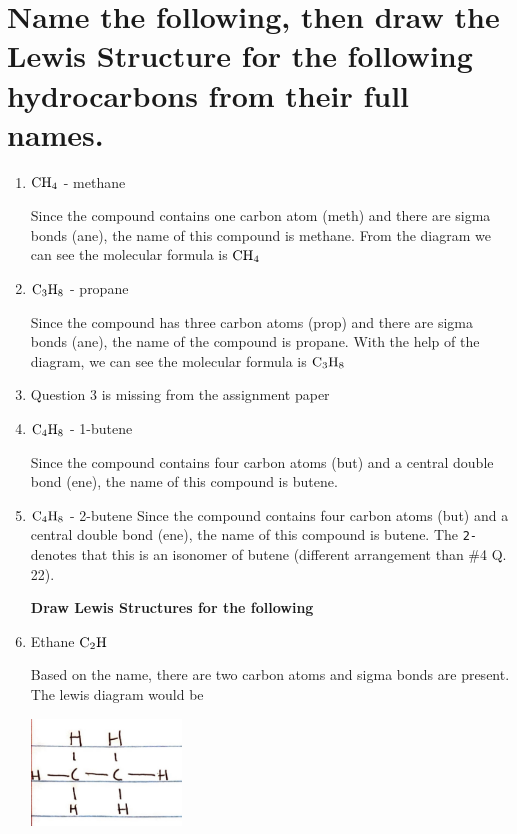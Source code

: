 \documentclass{scrartcl}
\begin{document}
\section{Name the following, then draw the Lewis Structure for the following hydrocarbons from their full names.}
\label{sec:orgc4225d2}
\begin{enumerate}
\item \(\ce{CH4}\) - methane

Since the compound contains one carbon atom (meth) and there are sigma bonds
(ane), the name of this compound is methane. From the diagram we can see the
molecular formula is    \(\ce{CH4}\)

\item \(\ce{C3H8}\) - propane

Since the compound has three carbon atoms (prop) and there are sigma bonds
(ane), the name of the compound is propane. With the help of the diagram, we
can see the molecular formula is    \(\ce{C3H8}\)

\item Question 3 is missing from the assignment paper

\item \(\ce{C4H8}\) - 1-butene

Since the compound contains four carbon atoms (but) and a central double bond
(ene), the name of this compound is butene.

\item \(\ce{C4H8}\) - 2-butene
Since the compound contains four carbon atoms (but) and a central double bond
(ene), the name of this compound is butene. The \texttt{2-} denotes that this is an
isonomer of butene (different arrangement than \#4 Q. 22).

\textbf{Draw Lewis Structures for the following}

\item Ethane \(\ce{C2H}\)

Based on the name, there are two carbon atoms and sigma bonds are present.
The lewis diagram would be

\begin{center}
\includegraphics[width=4cm]{./images/6.JPG}
\end{center}


\end{enumerate}
\end{document}
